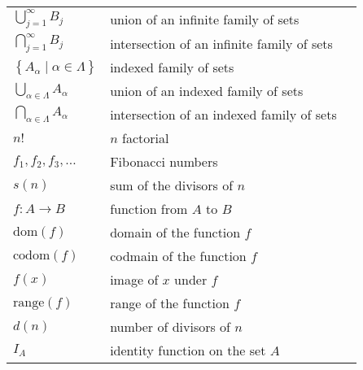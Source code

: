 \begin{tabular}{p{1in} p{2.5in} l}
$\bigcup\limits_{j=1}^{\infty}B_j$ & union of an infinite family of sets & \pageref{sym:unioninfiniteindex} \\
$\bigcap\limits_{j=1}^{\infty}B_j$ & intersection of an infinite family of sets & \pageref{sym:unioninfiniteindex} \\
$\left\{ A_\alpha \mid \alpha \in \Lambda \right\}$ & indexed family of sets & \pageref{sym:indexfamily} \\
$\bigcup\limits_{\alpha \in \Lambda}^{}A_\alpha $ & union of an indexed family of sets & \pageref{sym:unionindex} \\
$\bigcap\limits_{\alpha \in \Lambda}^{}A_\alpha $ & intersection of an indexed family of sets & \pageref{sym:interindex} \\
$n!$           &  $n$ factorial       &  \pageref{sym:factorial} \\
$f_1, f_2, f_3, \ldots $  &  Fibonacci numbers  &  \pageref{sym:fibonacci}  \\
$s ( n )$  &  sum of the divisors of $n$  &  \pageref{sym:sumdivisors}  \\
$f:A \to B$          &  function from $A$ to $B$     &  \pageref{sym:function}  \\
$\text{dom}( f )$  &  domain of the function $f$   &  \pageref{sym:domfunc}  \\
$\text{codom}( f )$  & codmain of the function $f$  &  \pageref{sym:codomain}  \\
$f( x )$   &  image of $x$ under $f$   &  \pageref{sym:fofx}  \\
$\text{range}( f )$  &  range of the function $f$   &  \pageref{sym:rangef}  \\
$d( n )$   &  number of divisors of $n$  &  \pageref{sym:numdivisors}  \\
$I_A$                 &  identity function on the set $A$  &  \pageref{sym:idfunc} \\
\end{tabular}

